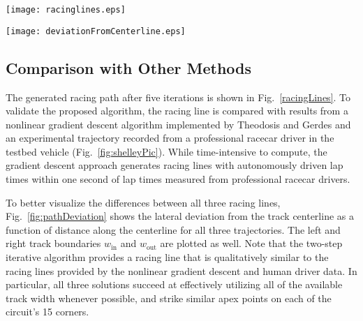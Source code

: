 \documentclass[twocolumn,10pt]{asme2ej}
\begin{document}
 \begin{figure*}
\centering
\texttt{[image: racinglines.eps]}
\caption{Overhead view of Thunderhill Raceway along with generated path from algorithm. Car drives in alphabetical direction around the closed circuit. Labeled regions a-h are locations of discrepancies between the 
two-step algorithm solution and comparison solutions.}
\label{racingLines}
\end{figure*}

\begin{figure*}
\centering
\texttt{[image: deviationFromCenterline.eps]}
\caption{Lateral path deviation of racing line from track centerline as a function of distance along the centerline. Note that upper and lower bounds on $e$ are not always symmetric
due to the initial centerline being a smooth approximation. Results
are compared with racing line from a nonlinear gradient descent algorithm and experimental data recorded from a professional racecar driver.}
\label{fig:pathDeviation}
\end{figure*}	

 
\subsection{Comparison with Other Methods}
The generated racing path after five iterations is shown in
Fig.~\ref{racingLines}. To validate the proposed algorithm, the racing line is compared with results from a nonlinear gradient descent algorithm implemented by 
Theodosis and Gerdes \cite{theodosis} and an experimental trajectory recorded from a professional racecar driver in the testbed vehicle (Fig.~\ref{fig:shelleyPic}).
 While time-intensive to compute, the gradient descent approach generates racing lines with autonomously driven lap times within one second of
lap times measured from professional racecar drivers. 

To better visualize the differences between all three racing lines, Fig.~\ref{fig:pathDeviation} shows the lateral deviation from the track centerline as a function of distance along the centerline 
for all three trajectories. The left and right track boundaries $w_\mathrm{in}$ and $w_\mathrm{out}$ are plotted as well. Note that the two-step iterative algorithm provides a 
racing line that is qualitatively similar to the racing lines provided by the nonlinear gradient descent and human driver data. In particular, all three
solutions succeed at effectively utilizing all of the available track width whenever possible, and strike similar apex points on each
of the circuit's 15 corners. 
\end{document}
